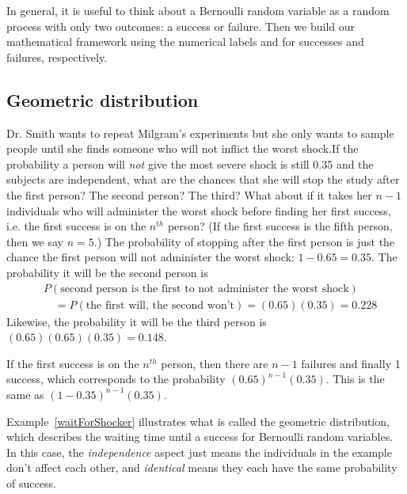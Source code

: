 In general, it is useful to think about a Bernoulli random variable as a random process with only two outcomes: a success or failure. Then we build our mathematical framework using the numerical labels  and  for successes and failures, respectively.


\subsection{Geometric distribution}


\begin{examplewrap}
\begin{nexample}{Dr. Smith wants to repeat Milgram's experiments but she only wants to sample people until she finds someone who will not inflict the worst shock.\footnotemark If the probability a person will \emph{not} give the most severe shock is still 0.35 and the subjects are independent, what are the chances that she will stop the study after the first person? The second person? The third? What about if it takes her $n-1$ individuals who will administer the worst shock before finding her first success, i.e. the first success is on the $n^{th}$ person? (If the first success is the fifth person, then we say $n=5$.)} \label{waitForShocker}
The probability of stopping after the first person is just the chance the first person will not administer the worst shock: $1-0.65=0.35$. The probability it will be the second person is
\begin{align*}
&P(\text{second person is the first to not administer the
    worst shock}) \\
&\quad = P(\text{the first will, the second won't})
    = (0.65)(0.35)
    = 0.228
\end{align*}
Likewise, the probability it will be the third person is $(0.65)(0.65)(0.35) = 0.148$.

If the first success is on the $n^{th}$ person, then there are $n-1$ failures and finally 1 success, which corresponds to the probability $(0.65)^{n-1}(0.35)$. This is the same as $(1-0.35)^{n-1}(0.35)$.
\end{nexample}
\end{examplewrap}

Example~\ref{waitForShocker} illustrates what is called the geometric distribution, which describes the waiting time until a success for  Bernoulli random variables. In this case, the \emph{independence} aspect just means the individuals in the example don't affect each other, and \emph{identical} means they each have the same probability of success.

